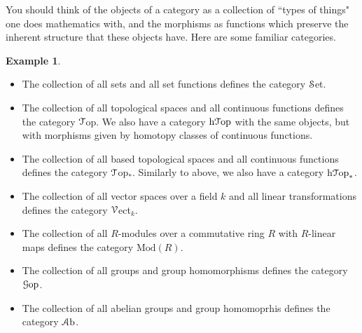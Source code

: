 \documentclass[10pt]{amsart}
\newcommand{\euscr}[1]{\EuScript{#1}}
\theoremstyle{definition}
\newtheorem{ex}[thm]{Example}
\begin{document}
You should think of the objects of a category as a collection of ``types of things" one does mathematics with, and the morphisms as functions which preserve the inherent structure that these objects have.
Here are some familiar categories.
\begin{ex}
    \hfill
    \begin{itemize}
        \item The collection of all sets and all set functions defines the category $\euscr{S}$et.
        \item The collection of all topological spaces and all continuous functions defines the category $\euscr{T}$op. We also have a category $\text{h}\euscr{T}\text{op}$ with the same objects, but with morphisms given by homotopy classes of continuous functions.
        \item The collection of all based topological spaces and all continuous functions defines the category $\euscr{T}$op$_*$. Similarly to above, we also have a category $\text{h}\euscr{T}\text{op}_*$.
        \item The collection of all vector spaces over a field $k$ and all linear transformations defines the category $\euscr{V}$ect$_k$.
        \item The collection of all $R$-modules over a commutative ring $R$ with $R$-linear maps defines the category $\text{Mod}(R)$.
        \item The collection of all groups and group homomorphisms defines the category $\euscr{G}\mathrm{op}$.
        \item The collection of all abelian groups and group homomoprhis defines the category $\euscr{A}\mathrm{b}$.
    \end{itemize}
\end{ex}
\end{document}
